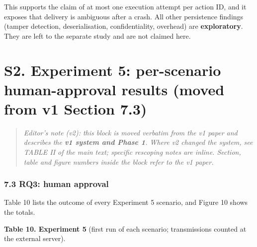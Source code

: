 \documentclass[10pt]{article}
\begin{document}
This supports the claim of at most one execution attempt per action ID, and it exposes that delivery is ambiguous after a crash. All other persistence findings (tamper detection, deserialisation, confidentiality, overhead) are \textbf{exploratory}. They are left to the separate study and are not claimed here.

\section*{S2. Experiment 5: per-scenario human-approval results (moved from v1 Section 7.3)}

\begin{quote}\small \emph{Editor's note (v2): this block is moved verbatim from the v1 paper and describes the \textbf{v1 system and Phase 1}. Where v2 changed the system, see TABLE II of the main text; specific rescoping notes are inline. Section, table and figure numbers inside the block refer to the v1 paper.}\end{quote}

\subsubsection*{7.3 RQ3: human approval}

Table 10 lists the outcome of every Experiment 5 scenario, and Figure 10 shows the totals.

\textbf{Table 10. Experiment 5} (first run of each scenario; transmissions counted at the external server).
\end{document}
